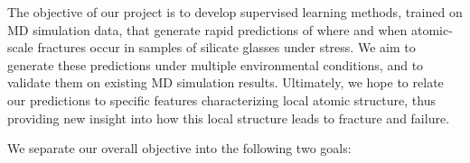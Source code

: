 The objective of our project is to develop supervised learning methods, trained on MD simulation data, that generate rapid predictions of where and when atomic-scale fractures occur in samples of silicate glasses under stress.  We aim to generate these predictions under multiple environmental conditions, and to validate them on existing MD simulation results.  Ultimately, we hope to relate our predictions to specific features characterizing local atomic structure, thus providing new insight into how this local structure leads to fracture and failure.

We separate our overall objective into the following two goals:


